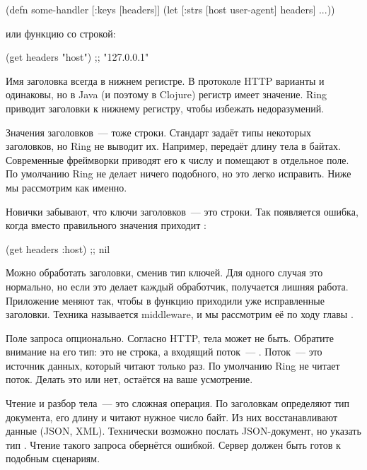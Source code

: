 \begin{clojure}
(defn some-handler
  [{:keys [headers]}]
  (let [{:strs [host user-agent]} headers]
    ...))
\end{clojure}

\fi

\noindent
или функцию  со строкой:

\begin{clojure}
(get headers "host") ;; "127.0.0.1"
\end{clojure}


Имя заголовка всегда в нижнем регистре. В протоколе HTTP варианты
 и  одинаковы, но в Java (и поэтому в
Clojure) регистр имеет значение. Ring приводит заголовки к нижнему регистру,
чтобы избежать недоразумений.

Значения заголовков~--- тоже строки. Стандарт задаёт типы некоторых заголовков,
но Ring не выводит их. Например,  передаёт длину тела в
байтах. Современные фреймворки приводят его к числу и помещают в отдельное
поле. По умолчанию Ring не делает ничего подобного, но это легко исправить. Ниже
мы рассмотрим как именно.

Новички забывают, что ключи заголовков~--- это строки. Так появляется ошибка, когда
вместо правильного значения приходит :

\begin{clojure}
(get headers :host) ;; nil
\end{clojure}

Можно обработать заголовки, сменив тип ключей. Для одного случая это нормально,
но если это делает каждый обработчик, получается лишняя работа. Приложение
меняют так, чтобы в функцию приходили уже исправленные заголовки. Техника
называется middleware, и мы рассмотрим её по ходу главы .


Поле запроса  опционально. Согласно HTTP, тела может не
быть. Обратите внимание на его тип: это не строка, а входящий поток~---
. Поток~--- это источник данных, который читают только
раз. По умолчанию Ring не читает поток. Делать это или нет, остаётся на ваше
усмотрение.


Чтение и разбор тела~--- это сложная операция. По заголовкам определяют тип
документа, его длину и читают нужное число байт. Из них восстанавливают данные
(JSON, XML). Технически возможно послать JSON-документ, но указать тип
. Чтение такого запроса обернётся ошибкой. Сервер должен быть
готов к подобным сценариям.


